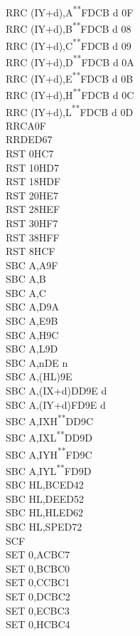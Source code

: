 \documentclass[12pt,twoside,openright,a4paper]{book}
\newcommand{\UNDOC}{\textnormal{\textsuperscript{**}}}
\begin{document}
\begin{multicols}{3}
{\begin{tabbing}
		RRC (IY+d),A\UNDOC\>FDCB d 0F\\
		RRC (IY+d),B\UNDOC\>FDCB d 08\\
		RRC (IY+d),C\UNDOC\>FDCB d 09\\
		RRC (IY+d),D\UNDOC\>FDCB d 0A\\
		RRC (IY+d),E\UNDOC\>FDCB d 0B\\
		RRC (IY+d),H\UNDOC\>FDCB d 0C\\
		RRC (IY+d),L\UNDOC\>FDCB d 0D\\
		RRCA\>0F\\
		RRD\>ED67\\
		RST 0H\>C7\\
		RST 10H\>D7\\
		RST 18H\>DF\\
		RST 20H\>E7\\
		RST 28H\>EF\\
		RST 30H\>F7\\
		RST 38H\>FF\\
		RST 8H\>CF\\
		SBC A,A\>9F\\
		SBC A,B\\
		SBC A,C\\
		SBC A,D\>9A\\
		SBC A,E\>9B\\
		SBC A,H\>9C\\
		SBC A,L\>9D\\
		SBC A,n\>DE n\\
		SBC A,(HL)\>9E\\
		SBC A,(IX+d)\>DD9E d\\
		SBC A,(IY+d)\>FD9E d\\
		SBC A,IXH\UNDOC\>DD9C\\
		SBC A,IXL\UNDOC\>DD9D\\
		SBC A,IYH\UNDOC\>FD9C\\
		SBC A,IYL\UNDOC\>FD9D\\
		SBC HL,BC\>ED42\\
		SBC HL,DE\>ED52\\
		SBC HL,HL\>ED62\\
		SBC HL,SP\>ED72\\
		SCF\\
		SET 0,A\>CBC7\\
		SET 0,B\>CBC0\\
		SET 0,C\>CBC1\\
		SET 0,D\>CBC2\\
		SET 0,E\>CBC3\\
		SET 0,H\>CBC4\\

\end{tabbing}}
\end{multicols}
\end{document}
